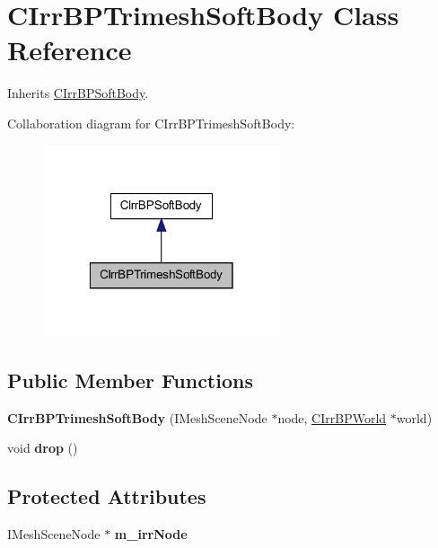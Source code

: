 \hypertarget{class_c_irr_b_p_trimesh_soft_body}{
\section{CIrrBPTrimeshSoftBody Class Reference}
\label{class_c_irr_b_p_trimesh_soft_body}
}


Inherits \hyperlink{class_c_irr_b_p_soft_body}{CIrrBPSoftBody}.



Collaboration diagram for CIrrBPTrimeshSoftBody:\nopagebreak
\begin{figure}[H]
\begin{center}
\leavevmode
\includegraphics[width=198pt]{class_c_irr_b_p_trimesh_soft_body__coll__graph}
\end{center}
\end{figure}
\subsection*{Public Member Functions}
\begin{DoxyCompactItemize}
\item 
\hypertarget{class_c_irr_b_p_trimesh_soft_body_a402d1b1a5f047956c301a078df0999ec}{
{\bfseries CIrrBPTrimeshSoftBody} (IMeshSceneNode $\ast$node, \hyperlink{class_c_irr_b_p_world}{CIrrBPWorld} $\ast$world)}
\label{class_c_irr_b_p_trimesh_soft_body_a402d1b1a5f047956c301a078df0999ec}

\item 
\hypertarget{class_c_irr_b_p_trimesh_soft_body_a01ed1954edb965b3184ae181762dedee}{
void {\bfseries drop} ()}
\label{class_c_irr_b_p_trimesh_soft_body_a01ed1954edb965b3184ae181762dedee}

\end{DoxyCompactItemize}
\subsection*{Protected Attributes}
\begin{DoxyCompactItemize}
\item 
\hypertarget{class_c_irr_b_p_trimesh_soft_body_aaeb70beb7203fb4f1702f33e731dd49e}{
IMeshSceneNode $\ast$ {\bfseries m\_\-irrNode}}
\label{class_c_irr_b_p_trimesh_soft_body_aaeb70beb7203fb4f1702f33e731dd49e}

\end{DoxyCompactItemize}


